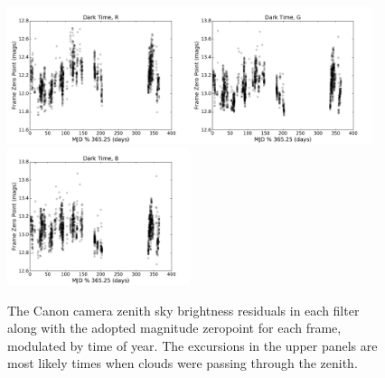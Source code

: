 \documentclass[]{spie}
\begin{document}
\begin{figure}[ht]
\begin{center}
  \includegraphics[height=4cm]{plots/zpTOY_R.pdf}\includegraphics[height=4cm]{plots/zpTOY_G.pdf}\includegraphics[height=4cm]{plots/zpTOY_B.pdf}
  \end{center}
  \caption{The Canon camera zenith sky brightness residuals in each filter along with the adopted magnitude zeropoint for each frame, modulated by time of year. The excursions in the upper panels are most likely times when clouds were passing through the zenith.  \label{fig:timeOfYear}}
\end{figure}
\end{document}
